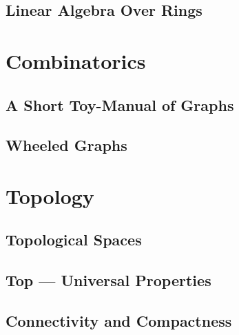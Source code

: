 \chapter{Linear Algebra Over Rings}




\part{Combinatorics}

\chapter{A Short Toy-Manual of Graphs}







\chapter{Wheeled Graphs}



\part{Topology}

\chapter{Topological Spaces}









\chapter{\textbf{Top} --- Universal Properties}





\chapter{Connectivity and Compactness}

